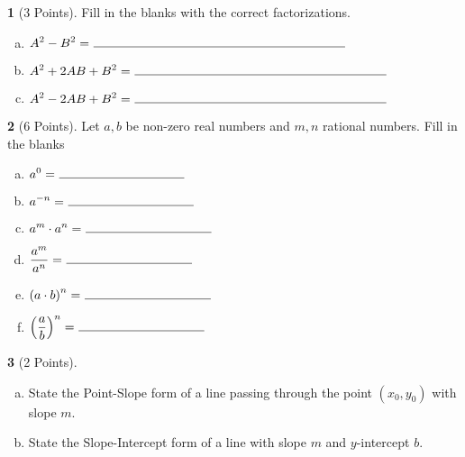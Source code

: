 \documentclass[12pt]{amsart}
\theoremstyle{definition}
\newtheorem{thm}{}
\begin{document}
\begin{thm}[3 Points]\label{def: special factorizations}
  Fill in the blanks with the correct factorizations.
  \vspace{.4in}
  \begin{enumerate}[(a)]
  \item
    $\displaystyle{A^2 - B^2 =\ \line(1,0){200}}$
    \vspace{.5in}
  \item
    $\displaystyle{A^2 + 2AB + B^2 =\ \line(1,0){200}}$
    \vspace{.5in}
  \item
    $\displaystyle{A^2 - 2AB + B^2 =\ \line(1,0){200}}$
    \vspace{.5in}
  \end{enumerate}
\end{thm}

\begin{thm}[6 Points]\label{def: exponents}
  Let $a, b$ be non-zero real numbers and $m, n$ rational numbers.
  Fill in the blanks
  \vspace{.15in}
  \begin{multicols}{2}
    \begin{enumerate}[(a)]
    \item
      $\displaystyle{a^0 =\ \line(1,0){100}}$
      \vspace{.4in}
    \item
      $\displaystyle{a^{-n} =\ \line(1,0){100}}$
      \vspace{.3in}
    \item
      $\displaystyle{a^m \cdot a^n =\ \line(1,0){100}}$
    \item
      $\displaystyle{\frac{a^m}{a^n}=\ \line(1,0){100}}$
      \vspace{.25in}
    \item
      $\displaystyle{\left(a \cdot b\right)^n=\ \line(1,0){100}}$
      \vspace{.25in}
    \item
      $\displaystyle{\left(\frac{a}{b}\right)^n=\ \line(1,0){100}}$
    \end{enumerate}
  \end{multicols}
\end{thm}

\begin{thm}[2 Points]
  \begin{enumerate}[(a)]
  \item
    State the Point-Slope form of a line passing through the point $(x_0, y_0)$ with slope $m$.
    \vspace{1in}
  \item
    State the Slope-Intercept form of a line with slope $m$ and $y$-intercept $b$.
    \vspace{1in}
  \end{enumerate}
\end{thm}
\end{document}
